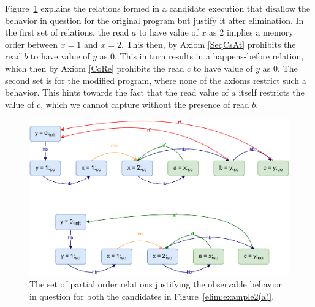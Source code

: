     Figure~\ref{elim:example2(b)} explains the relations formed in a candidate execution that disallow the behavior in question for the original program but justify it after elimination. 
    In the first set of relations, the read $a$ to have value of $x$ as $2$ implies a memory order between $x=1$ and $x=2$. 
    This then, by Axiom \ref{SeqCsAt} prohibits the read $b$ to have value of $y$ as $0$.
    This in turn results in a happens-before relation, which then by Axiom \ref{CoRe} prohibits the read $c$ to have value of $y$ as $0$.
    The second set is for the modified program, where none of the axioms restrict such a behavior\footnotemark. 
    This hints towards the fact that the read value of $a$ itself restricts the value of $c$, which we cannot capture without the presence of read $b$.
    \begin{figure}[H]
        \centering
        \includegraphics[scale=0.7]{5.Elimination/EliminationExample2(b).pdf}
        \caption{The set of partial order relations justifying the observable behavior in question for both the candidates in Figure~\ref{elim:example2(a)}.} 
        \label{elim:example2(b)}
    \end{figure}
    
